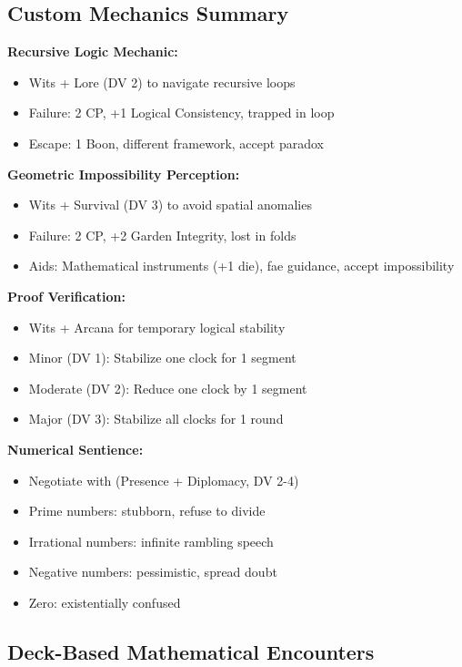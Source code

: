 \documentclass[11pt]{article}
\begin{document}
\subsection*{Custom Mechanics Summary}

\textbf{Recursive Logic Mechanic:}
\begin{itemize}
\item Wits + Lore (DV 2) to navigate recursive loops
\item Failure: 2 CP, +1 Logical Consistency, trapped in loop
\item Escape: 1 Boon, different framework, accept paradox
\end{itemize}

\textbf{Geometric Impossibility Perception:}
\begin{itemize}
\item Wits + Survival (DV 3) to avoid spatial anomalies
\item Failure: 2 CP, +2 Garden Integrity, lost in folds
\item Aids: Mathematical instruments (+1 die), fae guidance, accept impossibility
\end{itemize}

\textbf{Proof Verification:}
\begin{itemize}
\item Wits + Arcana for temporary logical stability
\item Minor (DV 1): Stabilize one clock for 1 segment
\item Moderate (DV 2): Reduce one clock by 1 segment
\item Major (DV 3): Stabilize all clocks for 1 round
\end{itemize}

\textbf{Numerical Sentience:}
\begin{itemize}
\item Negotiate with (Presence + Diplomacy, DV 2-4)
\item Prime numbers: stubborn, refuse to divide
\item Irrational numbers: infinite rambling speech
\item Negative numbers: pessimistic, spread doubt
\item Zero: existentially confused
\end{itemize}

\subsection*{Deck-Based Mathematical Encounters}
\end{document}
